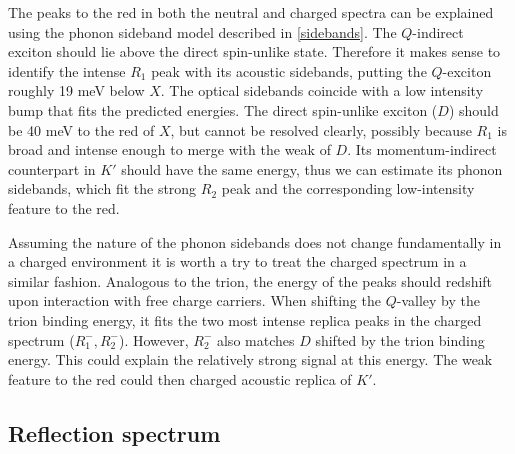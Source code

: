 The peaks to the red in both the neutral and charged spectra can be explained using the phonon sideband model described in \ref{sidebands}. The $Q$-indirect exciton should lie above the direct spin-unlike state. Therefore it makes sense to identify the intense $R_1$ peak with its acoustic sidebands, putting the $Q$-exciton roughly 19  meV below $X$. The optical sidebands coincide with a low intensity bump that fits the predicted energies. The direct spin-unlike exciton ($D$) should be 40 meV to the red of $X$, but cannot be resolved clearly, possibly because $R_1$ is broad and intense enough to merge with the weak \pl of $D$. Its momentum-indirect counterpart in $K'$ should have the same energy, thus we can estimate its phonon sidebands, which fit the strong $R_2$ peak and the corresponding low-intensity feature to the red.

Assuming the nature of the phonon sidebands does not change fundamentally in a charged environment it is worth a try to treat the charged spectrum in a similar fashion. Analogous to the trion, the energy of the peaks should redshift upon interaction with free charge carriers. When shifting the $Q$-valley by the trion binding energy, it fits the two most intense replica peaks in the charged spectrum ($R^-_1, R^-_2$). However, $R^-_2$ also matches $D$ shifted by the trion binding energy. This could explain the relatively strong signal at this energy. The weak feature to the red could then charged acoustic replica of $K'$. 

\subsection{Reflection spectrum}


